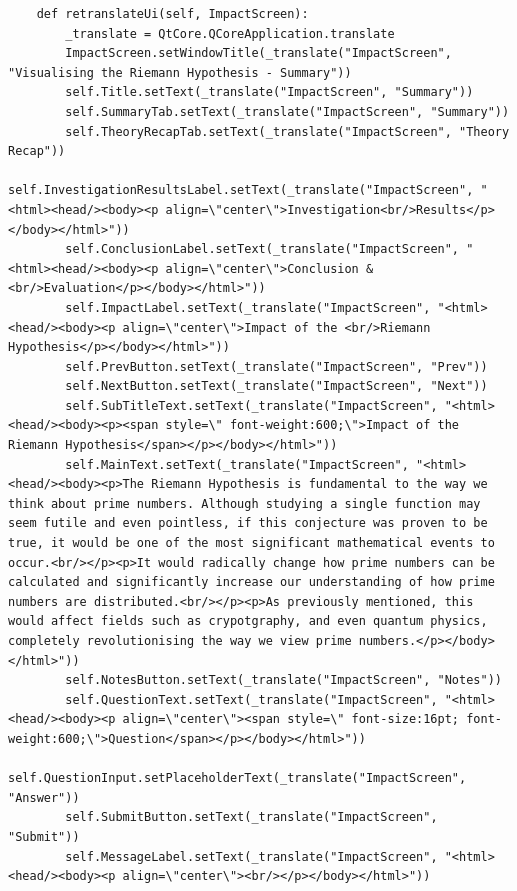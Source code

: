 \documentclass{article}
\begin{document}
\begin{lstlisting}
    def retranslateUi(self, ImpactScreen):
        _translate = QtCore.QCoreApplication.translate
        ImpactScreen.setWindowTitle(_translate("ImpactScreen", "Visualising the Riemann Hypothesis - Summary"))
        self.Title.setText(_translate("ImpactScreen", "Summary"))
        self.SummaryTab.setText(_translate("ImpactScreen", "Summary"))
        self.TheoryRecapTab.setText(_translate("ImpactScreen", "Theory Recap"))
        self.InvestigationResultsLabel.setText(_translate("ImpactScreen", "<html><head/><body><p align=\"center\">Investigation<br/>Results</p></body></html>"))
        self.ConclusionLabel.setText(_translate("ImpactScreen", "<html><head/><body><p align=\"center\">Conclusion & <br/>Evaluation</p></body></html>"))
        self.ImpactLabel.setText(_translate("ImpactScreen", "<html><head/><body><p align=\"center\">Impact of the <br/>Riemann Hypothesis</p></body></html>"))
        self.PrevButton.setText(_translate("ImpactScreen", "Prev"))
        self.NextButton.setText(_translate("ImpactScreen", "Next"))
        self.SubTitleText.setText(_translate("ImpactScreen", "<html><head/><body><p><span style=\" font-weight:600;\">Impact of the Riemann Hypothesis</span></p></body></html>"))
        self.MainText.setText(_translate("ImpactScreen", "<html><head/><body><p>The Riemann Hypothesis is fundamental to the way we think about prime numbers. Although studying a single function may seem futile and even pointless, if this conjecture was proven to be true, it would be one of the most significant mathematical events to occur.<br/></p><p>It would radically change how prime numbers can be calculated and significantly increase our understanding of how prime numbers are distributed.<br/></p><p>As previously mentioned, this would affect fields such as crypotgraphy, and even quantum physics, completely revolutionising the way we view prime numbers.</p></body></html>"))
        self.NotesButton.setText(_translate("ImpactScreen", "Notes"))
        self.QuestionText.setText(_translate("ImpactScreen", "<html><head/><body><p align=\"center\"><span style=\" font-size:16pt; font-weight:600;\">Question</span></p></body></html>"))
        self.QuestionInput.setPlaceholderText(_translate("ImpactScreen", "Answer"))
        self.SubmitButton.setText(_translate("ImpactScreen", "Submit"))
        self.MessageLabel.setText(_translate("ImpactScreen", "<html><head/><body><p align=\"center\"><br/></p></body></html>"))
\end{lstlisting}
\end{document}
